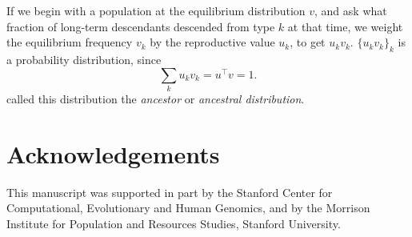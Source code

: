 \documentclass[9pt, a4paper, twocolumn]{extarticle}
\newcommand*{\tr}{^\intercal}
\begin{document}
If we begin with a population at the equilibrium distribution $v$,
and ask what fraction of long-term descendants descended from type $k$ at that time,
we weight the equilibrium frequency $v_k$ by the reproductive value $u_k$, to get $u_k v_k$.
$\{u_k v_k\}_{k}$ is a probability distribution, since
\begin{equation}
\sum_k {u_k v_k} = u\tr v = 1.
\end{equation}
\citet{Hermisson2002} called this distribution the \emph{ancestor} or \emph{ancestral distribution}.

{\small
\section*{Acknowledgements}

This manuscript was supported in part by the Stanford Center for Computational, Evolutionary and Human Genomics, and by the Morrison Institute for Population and Resources Studies, Stanford University.
}


%

\end{document}
